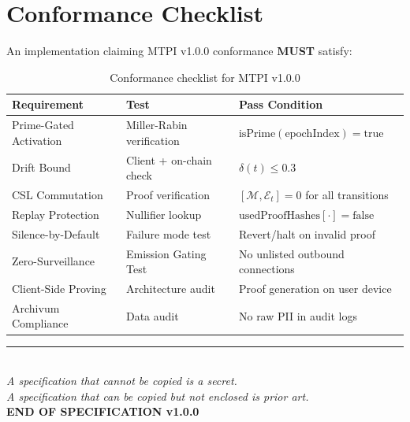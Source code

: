 \documentclass[11pt,a4paper]{article}
\begin{document}
\section{Conformance Checklist}

An implementation claiming MTPI v1.0.0 conformance \textbf{MUST} satisfy:

\begin{table}[h]
\centering
\begin{tabular}{@{}lll@{}}
\toprule
\textbf{Requirement} & \textbf{Test} & \textbf{Pass Condition} \\ \midrule
Prime-Gated Activation & Miller-Rabin verification & $\text{isPrime}(\text{epochIndex}) = \text{true}$ \\
Drift Bound & Client + on-chain check & $\delta(t) \leq 0.3$ \\
CSL Commutation & Proof verification & $[\mathcal{M}, \mathcal{E}_t] = 0$ for all transitions \\
Replay Protection & Nullifier lookup & $\text{usedProofHashes}[\cdot] = \text{false}$ \\
Silence-by-Default & Failure mode test & Revert/halt on invalid proof \\
Zero-Surveillance & Emission Gating Test & No unlisted outbound connections \\
Client-Side Proving & Architecture audit & Proof generation on user device \\
Archivum Compliance & Data audit & No raw PII in audit logs \\
\bottomrule
\end{tabular}
\caption{Conformance checklist for MTPI v1.0.0}
\end{table}

\vfill

\begin{center}
\rule{0.5\textwidth}{0.4pt}\\[0.5cm]
\textit{A specification that cannot be copied is a secret.\\
A specification that can be copied but not enclosed is prior art.}\\[0.5cm]
\textbf{END OF SPECIFICATION v1.0.0}
\end{center}
\end{document}
